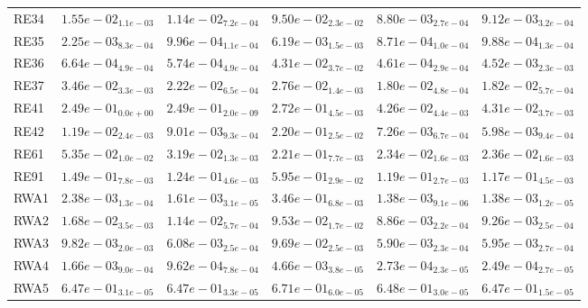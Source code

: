\documentclass{article}
\begin{document}
\begin{table}
\begin{scriptsize}
\begin{tabular}{llllll}
RE34 & $  1.55e-02_{ 1.1e-03}$ & $  1.14e-02_{ 7.2e-04}$ & $  9.50e-02_{ 2.3e-02}$ & \cellcolor{gray95}$  8.80e-03_{ 2.7e-04}$ & \cellcolor{gray25}$  9.12e-03_{ 3.2e-04}$ \\
RE35 & $  2.25e-03_{ 8.3e-04}$ & $  9.96e-04_{ 1.1e-04}$ & $  6.19e-03_{ 1.5e-03}$ & \cellcolor{gray95}$  8.71e-04_{ 1.0e-04}$ & \cellcolor{gray25}$  9.88e-04_{ 1.3e-04}$ \\
RE36 & $  6.64e-04_{ 4.9e-04}$ & \cellcolor{gray25}$  5.74e-04_{ 4.9e-04}$ & $  4.31e-02_{ 3.7e-02}$ & \cellcolor{gray95}$  4.61e-04_{ 2.9e-04}$ & $  4.52e-03_{ 2.3e-03}$ \\
RE37 & $  3.46e-02_{ 3.3e-03}$ & $  2.22e-02_{ 6.5e-04}$ & $  2.76e-02_{ 1.4e-03}$ & \cellcolor{gray95}$  1.80e-02_{ 4.8e-04}$ & \cellcolor{gray25}$  1.82e-02_{ 5.7e-04}$ \\
RE41 & $  2.49e-01_{ 0.0e+00}$ & $  2.49e-01_{ 2.0e-09}$ & $  2.72e-01_{ 4.5e-03}$ & \cellcolor{gray95}$  4.26e-02_{ 4.4e-03}$ & \cellcolor{gray25}$  4.31e-02_{ 3.7e-03}$ \\
RE42 & $  1.19e-02_{ 2.4e-03}$ & $  9.01e-03_{ 9.3e-04}$ & $  2.20e-01_{ 2.5e-02}$ & \cellcolor{gray25}$  7.26e-03_{ 6.7e-04}$ & \cellcolor{gray95}$  5.98e-03_{ 9.4e-04}$ \\
RE61 & $  5.35e-02_{ 1.0e-02}$ & $  3.19e-02_{ 1.3e-03}$ & $  2.21e-01_{ 7.7e-03}$ & \cellcolor{gray95}$  2.34e-02_{ 1.6e-03}$ & \cellcolor{gray25}$  2.36e-02_{ 1.6e-03}$ \\
RE91 & $  1.49e-01_{ 7.8e-03}$ & $  1.24e-01_{ 4.6e-03}$ & $  5.95e-01_{ 2.9e-02}$ & \cellcolor{gray25}$  1.19e-01_{ 2.7e-03}$ & \cellcolor{gray95}$  1.17e-01_{ 4.5e-03}$ \\
RWA1 & $  2.38e-03_{ 1.3e-04}$ & $  1.61e-03_{ 3.1e-05}$ & $  3.46e-01_{ 6.8e-03}$ & \cellcolor{gray95}$  1.38e-03_{ 9.1e-06}$ & \cellcolor{gray25}$  1.38e-03_{ 1.2e-05}$ \\
RWA2 & $  1.68e-02_{ 3.5e-03}$ & $  1.14e-02_{ 5.7e-04}$ & $  9.53e-02_{ 1.7e-02}$ & \cellcolor{gray95}$  8.86e-03_{ 2.2e-04}$ & \cellcolor{gray25}$  9.26e-03_{ 2.5e-04}$ \\
RWA3 & $  9.82e-03_{ 2.0e-03}$ & $  6.08e-03_{ 2.5e-04}$ & $  9.69e-02_{ 2.5e-03}$ & \cellcolor{gray95}$  5.90e-03_{ 2.3e-04}$ & \cellcolor{gray25}$  5.95e-03_{ 2.7e-04}$ \\
RWA4 & $  1.66e-03_{ 9.0e-04}$ & $  9.62e-04_{ 7.8e-04}$ & $  4.66e-03_{ 3.8e-05}$ & \cellcolor{gray25}$  2.73e-04_{ 2.3e-05}$ & \cellcolor{gray95}$  2.49e-04_{ 2.7e-05}$ \\
RWA5 & $  6.47e-01_{ 3.1e-05}$ & \cellcolor{gray25}$  6.47e-01_{ 3.3e-05}$ & $  6.71e-01_{ 6.0e-05}$ & $  6.48e-01_{ 3.0e-05}$ & \cellcolor{gray95}$  6.47e-01_{ 1.5e-05}$ \\

\end{tabular}
\end{scriptsize}
\end{table}
\end{document}
